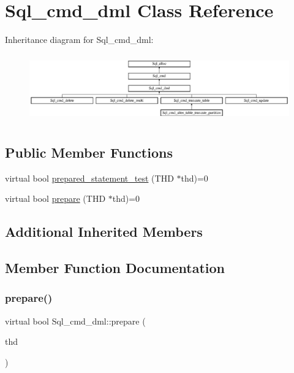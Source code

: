 \hypertarget{classSql__cmd__dml}{}\section{Sql\+\_\+cmd\+\_\+dml Class Reference}
\label{classSql__cmd__dml}
Inheritance diagram for Sql\+\_\+cmd\+\_\+dml\+:\begin{figure}[H]
\begin{center}
\leavevmode
\includegraphics[height=2.941177cm]{classSql__cmd__dml}
\end{center}
\end{figure}
\subsection*{Public Member Functions}
\begin{DoxyCompactItemize}
\item 
virtual bool \mbox{\hyperlink{classSql__cmd__dml_af36dc69e855d0e48d0e79002576907a4}{prepared\+\_\+statement\+\_\+test}} (T\+HD $\ast$thd)=0
\item 
virtual bool \mbox{\hyperlink{classSql__cmd__dml_ad395374af7ac799573ca41d87b60b977}{prepare}} (T\+HD $\ast$thd)=0
\end{DoxyCompactItemize}
\subsection*{Additional Inherited Members}


\subsection{Member Function Documentation}
\mbox{\label{classSql__cmd__dml_ad395374af7ac799573ca41d87b60b977}} 
\subsubsection{\texorpdfstring{prepare()}{prepare()}}
{\footnotesize\ttfamily virtual bool Sql\+\_\+cmd\+\_\+dml\+::prepare (\begin{DoxyParamCaption}\item[{T\+HD $\ast$}]{thd }\end{DoxyParamCaption})\hspace{0.3cm}{\ttfamily [pure virtual]}}


